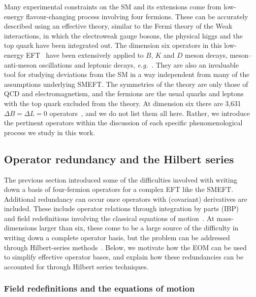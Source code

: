 Many experimental constraints on the SM and its extensions come from low-energy
flavour-changing process involving four fermions. These can be accurately
described using an effective theory, similar to the Fermi theory of the Weak
interactions, in which the electroweak gauge bosons, the physical higgs and the
top quark have been integrated out. The dimension six operators in this
low-energy EFT~\cite{Jenkins:2017jig, Aebischer:2017gaw, Jenkins:2017dyc,
  Aebischer:2015fzz} have been extensively applied to $B$, $K$ and $D$ meson
decays, meson--anti-meson oscillations and leptonic decays,
\textit{e.g.}~\cite{Buchalla:1995vs}. They are also an invaluable tool for
studying deviations from the SM in a way independent from many of the
assumptions underlying SMEFT. The symmetries of the theory are only those of QCD
and electromagnetism, and the fermions are the usual quarks and leptons with the
top quark excluded from the theory. At dimension six there are 3,631
$\Delta B = \Delta L = 0$ operators~\cite{Jenkins:2017jig}, and we do not list
them all here. Rather, we introduce the pertinent operators within the
discussion of each specific phenomenological process we study in this work.

\subsection{Operator redundancy and the Hilbert series}

The previous section introduced some of the difficulties involved with writing
down a basis of four-fermion operators for a complex EFT like the SMEFT.
Additional redundancy can occur once operators with (covariant) derivatives are
included. These include operator relations through integration by parts (IBP)
and field redefinitions involving the classical equations of
motion~\cite{Buchmuller:1985jz, Arzt:1993gz, Georgi:1991ch}. At mass-dimensions
larger than six, these come to be a large source of the difficulty in writing
down a complete operator basis, but the problem can be addressed through
Hilbert-series methods~\cite{Lehman:2015via, Henning:2015daa, Lehman:2015coa,
  Henning:2015alf, Henning:2017fpj}. Below, we motivate how the EOM can be used
to simplify effective operator bases, and explain how these redundancies can be
accounted for through Hilbert series techniques.

\subsubsection{Field redefinitions and the equations of motion}
\label{sec:ch1-eom}

